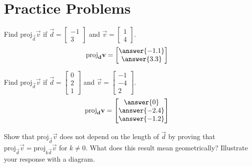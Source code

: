 \documentclass{ximera}
\begin{document}
\section*{Practice Problems}

  \begin{problem}\label{prob:proj1a}
  Find $\mbox{proj}_{\vec{d}}\vec{v}$ if $\vec{d}=\begin{bmatrix}-1\\3\end{bmatrix}$ and $\vec{v}=\begin{bmatrix}1\\4\end{bmatrix}$.
  $$\mbox{proj}_{\vec{d}}\vec{v}=\begin{bmatrix}\answer{-1.1}\\\answer{3.3}\end{bmatrix}$$
    \end{problem}
    
    \begin{problem}\label{prob:proj1b}
    Find $\mbox{proj}_{\vec{d}}\vec{v}$ if $\vec{d}=\begin{bmatrix}0\\2\\1\end{bmatrix}$ and $\vec{v}=\begin{bmatrix}-1\\-4\\2\end{bmatrix}$.
    $$\mbox{proj}_{\vec{d}}\vec{v}=\begin{bmatrix}\answer{0}\\\answer{-2.4}\\\answer{-1.2}\end{bmatrix}$$
    \end{problem}

    \begin{problem}\label{prob:proj3}
Show that $\mbox{proj}_{\vec{d}}\vec{v}$ does not depend on the length of $\vec{d}$ by proving that $\mbox{proj}_{\vec{d}}\vec{v}=\mbox{proj}_{k\vec{d}}\vec{v}$ for $k\neq 0$.  What does this result mean geometrically?  Illustrate your response with a diagram.
\end{problem}
\end{document}
